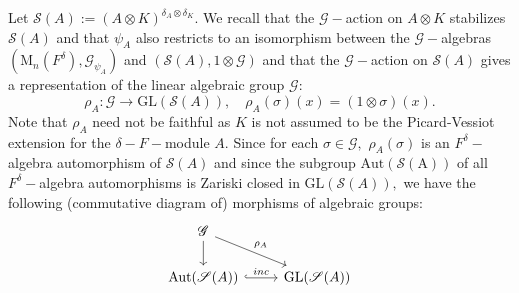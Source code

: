 \documentclass[preprint, 11pt]{amsart}
\theoremstyle{corollary}
\theoremstyle{remark}
\theoremstyle{proposition}
\numberwithin{equation}{subsection}
\begin{document}
	Let $\mathscr S(A):=(A\otimes K)^{\delta_A\otimes \delta_K}.$  We recall that the $\mathscr G-$action on $A\otimes K$ stabilizes $\mathscr S(A)$ and that $\psi_A$ also restricts to an isomorphism between the $\mathscr G-$algebras $\left(\mathrm{M}_n(F^{\delta}), \mathscr G_{\psi_A}\right)$ and $\left(\mathscr S(A), 1\otimes \mathscr{G}\right)$ and that  the $\mathscr G-$action on $\mathscr S(A)$ gives a representation of the linear algebraic group $\mathscr G:$ $$\rho_A: \mathscr{G}\rightarrow\mathrm{GL}(\mathscr S(A)), \quad \rho_A(\sigma)(x)=(1\otimes \sigma)(x).$$  Note that $\rho_A$ need not be faithful as $K$ is not assumed to be the Picard-Vessiot extension for the $\delta-F-$module $A.$ Since for each $\sigma\in \mathscr{G},$ $\rho_A(\sigma)$ is an $F^{\delta}-$algebra automorphism of $\mathscr S(A)$ and  since the subgroup $\mathrm{Aut(\mathscr S(A))}$ of all  $F^{\delta}-$algebra automorphisms is Zariski closed in $\mathrm{GL}(\mathscr S(A)),$ we have  the following (commutative diagram of) morphisms of algebraic groups:
	\begin{equation*}\label{algebraicgrouprep}
		\begin{tikzcd}
			\mathscr{G}\arrow[dr, rightarrow, "\rho_A"] \arrow[d, rightarrow]& \\
			\mathrm{Aut}(\mathscr S(A))\arrow[r, hookrightarrow,"inc"]&\mathrm{GL}(\mathscr S(A))
		\end{tikzcd}
	\end{equation*}
	
\end{document}
